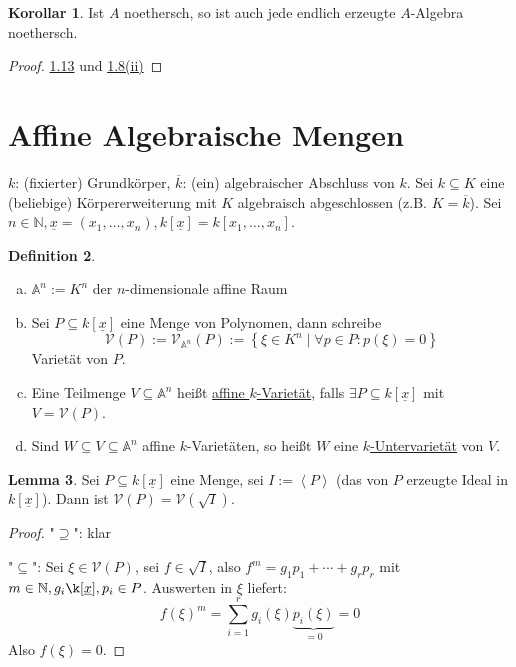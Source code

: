\documentclass[
twoside=semi,
fontsize=12,
DIV=12, 
cleardoublepage=current,
leqno,
headings=optiontoheadandtoc, 
toc=idx
]{scrbook}
\newcommand{\N}{\mathbb{N}}
\newcommand{\A}{\mathbb{A}}
\newcommand{\V}{\mathcal{V}}
\newcommand{\bracC}[1]{\left< #1 \right>}
\newcommand{\set}[1]{\left\{ #1 \right\}}
\newcommand{\emphasize}[1]{\underline{#1}}
\theoremstyle{definition}
\newtheorem{definition}{Definition}[section]
\newtheorem{lemma}[definition]{Lemma}
\newtheorem{korollar}[definition]{Korollar}
\begin{document}
	\begin{korollar}\label{1.1.14}\hfill\newline
		Ist $A$ noethersch, so ist auch jede endlich erzeugte $A$-Algebra noethersch.
	\end{korollar}
	
	\begin{proof}
		\hyperref[1.1.13]{1.13} und \hyperref[1.1.8.2]{1.8(ii)}
	\end{proof}

	\newpage
	\section{Affine Algebraische Mengen}\thispagestyle{sectionstart}
	$k$: (fixierter) Grundk\"orper, $\overline{k}$: (ein) algebraischer Abschluss von $k$. Sei $k \subseteq K$ eine (beliebige) K\"orpererweiterung mit $K$ algebraisch abgeschlossen (z.B. $K=\overline{k}$). \newline
	Sei $n \in \N, \underline{x} = (x_1, \dots, x_n), k[\underline{x}] = k[x_1, \dots, x_n]$.
	
	\begin{definition}\label{1.2.1}\hfill
		\begin{enumerate}[(a)]
			\item $\A^n := K^n$ der $n$-dimensionale affine Raum
			
			\item Sei $P \subseteq k[\underline{x}]$ eine Menge von Polynomen, dann schreibe 	
				\[\V(P) := \V_{\A^n}(P) := \set{\xi \in K^n \mid \forall p \in P: p(\xi) = 0}\]
			Variet\"at von $P$.
			\item Eine Teilmenge $V \subseteq \A^n$ hei\ss t \emphasize{affine $k$-Variet\"at}, falls $\exists P \subseteq k[\underline{x}]$ mit $V = \V(P)$.
			
			\item Sind $W \subseteq V \subseteq \A^n$ affine $k$-Variet\"aten, so hei\ss t $W$ eine \emphasize{$k$-Untervariet\"at} von $V$. 
		\end{enumerate}
	\end{definition}

	\begin{lemma}\label{1.2.2}\hfill\newline
		Sei $P \subseteq k[\underline{x}]$ eine Menge, sei $I:= \bracC{P}$ (das von $P$ erzeugte Ideal in $k[\underline{x}]$). Dann ist 
		$\V(P) = \V(\sqrt{I})$.
	\end{lemma}

	\begin{proof}\hfill\newline
		"$\supseteq$": klar
		
		\medskip\noindent
		"$\subseteq$": Sei $\xi \in \V(P)$, sei $f \in \sqrt{I}$, also $f^m = g_1p_1 + \cdots +g_rp_r$ mit $m \in \N, g_i \k[\underline{x}], p_i \in P$. Auswerten in $\xi$ liefert:
			\[f(\xi)^m = \sum_{i=1}^r g_i(\xi)\underbrace{p_i(\xi)}_{=0} = 0\]
		Also $f(\xi) = 0$.
	\end{proof}
\end{document}
